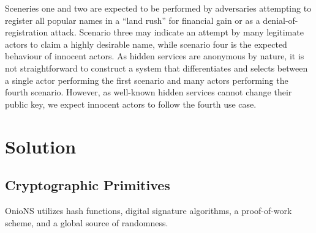 \documentclass[USenglish,oneside,twocolumn]{article}
\begin{document}
Sceneries one and two are expected to be performed by adversaries attempting to register all popular names in a ``land rush'' for financial gain or as a denial-of-registration attack. Scenario three may indicate an attempt by many legitimate actors to claim a highly desirable name, while scenario four is the expected behaviour of innocent actors. As hidden services are anonymous by nature, it is not straightforward to construct a system that differentiates and selects between a single actor performing the first scenario and many actors performing the fourth scenario. However, as well-known hidden services cannot change their public key, we expect innocent actors to follow the fourth use case.

\section{Solution}
\label{sec:Solution}

\subsection{Cryptographic Primitives}
\label{sec:cryptoPrimitives}

OnioNS utilizes hash functions, digital signature algorithms, a proof-of-work scheme, and a global source of randomness.
\end{document}
